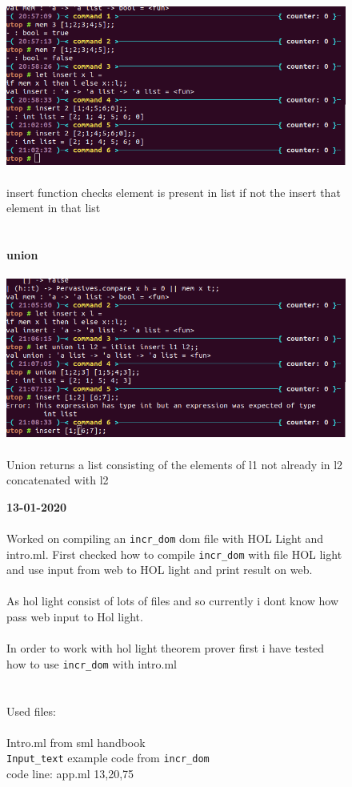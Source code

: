 \documentclass[15]{article}
\begin{document}
\begin{figure}
\includegraphics[scale = .5]{images/image12.png}
\\
\\
insert function checks element is present in list if not the insert that element in that list\\
\\
\\
\textbf{union}\\
\\
\includegraphics[scale = .5]{images/image6.png}
\\
\\
Union returns a list consisting of the elements of l1 not already in l2 concatenated with l2\\

\pagebreak

\textbf{13-01-2020}\\
\\
Worked on compiling an \texttt{incr\_dom} dom file with HOL Light and intro.ml.
First checked how to compile \texttt{incr\_dom} with file HOL light and use input from
web to HOL light and print result on web.\\
\\
As hol light consist of lots of files and so currently i dont know how
pass web input to Hol light.\\
\\
In order to work with hol light theorem prover first i have tested how to use
\texttt{incr\_dom}  with intro.ml\\
\\
\\
Used files:\\
\\
Intro.ml from sml handbook\\
\texttt{Input\_text} example code from \texttt{incr\_dom}
\\
code line: app.ml 13,20,75


\end{figure}
\end{document}
